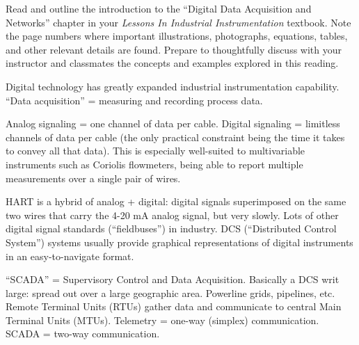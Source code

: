 

Read and outline the introduction to the ``Digital Data Acquisition and Networks'' chapter in your {\it Lessons In Industrial Instrumentation} textbook.  Note the page numbers where important illustrations, photographs, equations, tables, and other relevant details are found.  Prepare to thoughtfully discuss with your instructor and classmates the concepts and examples explored in this reading.














Digital technology has greatly expanded industrial instrumentation capability.  ``Data acquisition'' = measuring and recording process data.  

\vskip 10pt

Analog signaling = one channel of data per cable.  Digital signaling = limitless channels of data per cable (the only practical constraint being the time it takes to convey all that data).  This is especially well-suited to multivariable instruments such as Coriolis flowmeters, being able to report multiple measurements over a single pair of wires.

\vskip 10pt

HART is a hybrid of analog + digital: digital signals superimposed on the same two wires that carry the 4-20 mA analog signal, but very slowly.  Lots of other digital signal standards (``fieldbuses'') in industry.  DCS (``Distributed Control System'') systems usually provide graphical representations of digital instruments in an easy-to-navigate format.

\vskip 10pt

``SCADA'' = Supervisory Control and Data Acquisition.  Basically a DCS writ large: spread out over a large geographic area.  Powerline grids, pipelines, etc.  Remote Terminal Units (RTUs) gather data and communicate to central Main Terminal Units (MTUs).  Telemetry = one-way (simplex) communication.  SCADA = two-way communication.

